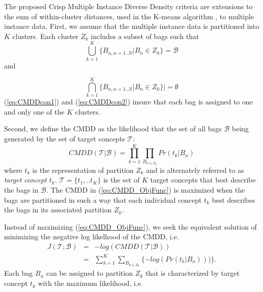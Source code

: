\documentclass[12pt,dvips]{report}
\numberwithin{equation}{section}
\begin{document}

The proposed Crisp Multiple Instance Diverse Density criteria are extensions to the sum of within-cluster distances, used in the K-means algorithm \cite{macqueen1967kmeans}, to multiple instance data.  First, we assume that the multiple instance data is partitioned into $K$ clusters.  Each cluster $Z_{k}$ includes a subset of bags such that
\begin{equation} \label{eq:CMDDcon1}
\bigcup\limits_{k=1}^K \{B_{n, n=1..N}\vert B_{n}\in Z_{k}\}=\mathcal{B}
\end{equation} and

\begin{equation} \label{eq:CMDDcon2}
\bigcap\limits_{k=1}^K \{B_{n, n=1..N}\vert B_{n}\in Z_{k}\}\vert =\emptyset
\end{equation} (\ref{eq:CMDDcon1}) and (\ref{eq:CMDDcon2}) insure that each bag is assigned to one and only one of the $K$ clusters.

Second, we define the CMDD as the likelihood that the set of all bags $\mathcal{B}$ being generated by the set of target concepts $\mathcal{T}$:
\begin{equation} \label{eq:CMDD_ObjFunc}
CMDD(\mathcal{T} \vert  \mathcal{B}) = \prod_{k=1}^{K}\prod_{B_{n \in Z_{k}}}Pr(t_{k}\vert B_{n})
\end{equation} where $t_{k}$ is the representation of partition $Z_{k}$ and is alternately referred to as \emph{target concept $t_{k}$}.  $\mathcal{T}=\{t_{1},..t_{K}\}$ is the set of $K$ target concepts that best describe the bags in $\mathcal{B}$.  The CMDD in (\ref{eq:CMDD_ObjFunc}) is maximized when the bags are partitioned in such a way that each individual concept $t_{k}$ best describes the bags in its associated partition $Z_{k}$.  

Instead of maximizing (\ref{eq:CMDD_ObjFunc}), we seek the equivalent solution of minimizing the negative log likelhood of the CMDD, i.e.
\begin{eqnarray} \label{eq:CMDD_neglog}
J(\mathcal{T} ; \mathcal{B}) & = &  -log(CMDD(\mathcal{T} \vert  \mathcal{B})) \nonumber \\
  & = & \sum_{k=1}^{K}\sum_{B_{n \in Z_{k}}}\{-log(Pr(t_{k}\vert B_{n})))\}.
\end{eqnarray} Each bag $B_{n}$ can be assigned to partition $Z_{k}$ that is characterized by target concept $t_{k}$ with the maximum likelihood, i.e.
\end{document}
